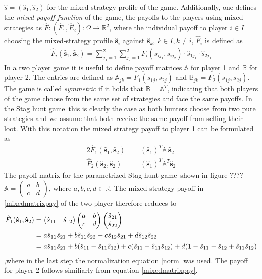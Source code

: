 \documentclass[12pt]{article}
\newcommand{\sthuga}{Stag hunt game}
\newcommand{\realnumb}{\mathbb{R}}
\newcommand{\stu}{s}
\newcommand{\pay}{F}
\newcommand{\sprob}{\hat{s}}
\newcommand{\svec}{\vec{\sprob}}
\renewcommand{\vec}{\mathbf}
\newcommand{\mixpay}{\hat{\pay}}
\newcommand{\mixstratspace}{\Omega}
\newcommand{\payma}{\mathbb{A}}
\begin{document}
$\sprob = \left(\sprob_1,\sprob_2\right)$ for the mixed strategy profile of 
the game. 
Additionally, one defines the \textit{mixed payoff function} of the game,
the payoffs to the players using mixed strategies as 
$\mixpay: (\mixpay_1,\mixpay_2): \mixstratspace \rightarrow \realnumb^2$, 
where the individual payoff to player $i \in I$ choosing the mixed-strategy 
profile $\svec_i$ against $\svec_k$,  $k \in I, k \neq i$, $\mixpay_i$ is 
defined as
\begin{align}
        \mixpay_i(\svec_1,\svec_2) = \sum_{j_{1}=1}^{2} \sum_{j_{2}=1}^{2} 
        \pay_{i}(\stu_{i{j_1}},\stu_{i{j_2}}) \cdot \sprob_{1j_1} \cdot 
        \sprob_{2j_1}
\end{align}
In a two player game it is useful to define payoff matrices $\payma$ for player
1 and $\mathbb{B}$ for player 2. The entries are defined as $\payma_{jk} = 
\pay_1(s_{1j},s_{2j})$ and $\mathbb{B}_{jk} = \pay_2(s_{1j},s_{2j})$. 
The game is called \textit{symmetric} if it holds that $\mathbb{B} = \payma^T$,
indicating that both players of the game choose from the same set of strategies
and face the same payoffs. In the \sthuga\ this is clearly the case as both
hunters choose from two pure strategies and we assume that both receive the
same payoff from selling their loot. 
With this notation the mixed strategy payoff to player 1 can be
formulated as
\begin{alignat}{2}
        \mixpay_1(\svec_1,\svec_2) &= (\svec_1)^T \payma \ \svec_2 \\
        \mixpay_2(\svec_2,\svec_2) &= (\svec_1)^T \payma^T \svec_2
        \label{mixedmatrixpay}
   \end{alignat}
The payoff matrix for the parametrized \sthuga\ shown in figure ???? %
$\payma = \begin{pmatrix} a & b \\ c & d \end{pmatrix}$, where 
$a,b,c,d \in \realnumb$. The mixed strategy payoff in \eqref{mixedmatrixpay}
of the two player therefore reduces to 
\begin{alignat}{2}
        \mixpay_1(\svec_1,\svec_2) &= \mqty(\sprob_{11} & \sprob_{12}) 
        \pmqty{a & b \\ c & d} \pmqty{\sprob_{21} \\ \sprob_{22}}
        \\
        &= a \sprob_{11} \sprob_{21} + b \sprob_{11} \sprob_{22} 
        + c \sprob_{12} \sprob_{21} + d \sprob_{12} \sprob_{22}
        \\
        &= a \sprob_{11} \sprob_{21} + b (\sprob_{11} - \sprob_{11} \sprob_{12} 
        ) +c (\sprob_{11} - \sprob_{11} \sprob_{12}) + d ( 1- \sprob_{11}- \sprob_{12}   
        + \sprob_{11} \sprob_{12} ) 
\end{alignat}
,where in the last step the normalization equation \eqref{norm} was used.
The payoff for player 2 follows similiarly from equation \eqref{mixedmatrixpay}.
\end{document}
